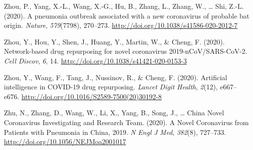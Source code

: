 \documentclass[12pt,twoside,openany,\mydriver]{thesis}  %
\begin{document}
\leavevmode\hypertarget{ref-zhou_pneumonia_2020}{}%
Zhou, P., Yang, X.-L., Wang, X.-G., Hu, B., Zhang, L., Zhang, W., \ldots{} Shi, Z.-L. (2020). A pneumonia outbreak associated with a new coronavirus of probable bat origin. \emph{Nature}, \emph{579}(7798), 270--273. \url{http://doi.org/10.1038/s41586-020-2012-7}

\leavevmode\hypertarget{ref-zhou_network-based_2020}{}%
Zhou, Y., Hou, Y., Shen, J., Huang, Y., Martin, W., \& Cheng, F. (2020). Network-based drug repurposing for novel coronavirus 2019-nCoV/SARS-CoV-2. \emph{Cell Discov}, \emph{6}, 14. \url{http://doi.org/10.1038/s41421-020-0153-3}

\leavevmode\hypertarget{ref-zhou_artificial_2020}{}%
Zhou, Y., Wang, F., Tang, J., Nussinov, R., \& Cheng, F. (2020). Artificial intelligence in COVID-19 drug repurposing. \emph{Lancet Digit Health}, \emph{2}(12), e667--e676. \url{http://doi.org/10.1016/S2589-7500(20)30192-8}

\leavevmode\hypertarget{ref-zhu_novel_2020}{}%
Zhu, N., Zhang, D., Wang, W., Li, X., Yang, B., Song, J., \ldots{} China Novel Coronavirus Investigating and Research Team. (2020). A Novel Coronavirus from Patients with Pneumonia in China, 2019. \emph{N Engl J Med}, \emph{382}(8), 727--733. \url{http://doi.org/10.1056/NEJMoa2001017}
\end{document}
